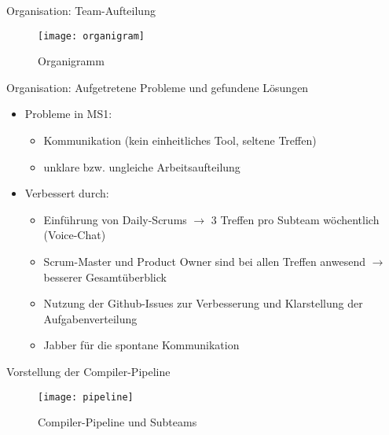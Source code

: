 \begin{frame}{Organisation: Team-Aufteilung}

\begin{figure}
  \begin{center}
    \leavevmode
      \texttt{[image: organigram]}
    \caption{Organigramm}
  \end{center}
\end{figure}

\end{frame}

\pagebreak

\begin{frame}{Organisation: Aufgetretene Probleme und gefundene L\"osungen}
	
	\pause
	\begin{itemize}
		\item Probleme in MS1:
		\pause
		\begin{itemize}
			\item Kommunikation (kein einheitliches Tool, seltene Treffen)
			\pause
			\item unklare bzw. ungleiche Arbeitsaufteilung
			\pause
		\end{itemize}
		\item Verbessert durch:
		\pause
		\begin{itemize}
			\item Einf\"uhrung von Daily-Scrums $\rightarrow$ 3 Treffen pro Subteam w\"ochentlich (Voice-Chat)
			\pause
			\item Scrum-Master und Product Owner sind bei allen Treffen anwesend $\rightarrow$ besserer Gesamt\"uberblick
			\pause
			\item Nutzung der Github-Issues zur Verbesserung und Klarstellung der Aufgabenverteilung
			\pause
			\item Jabber f\"ur die spontane Kommunikation
		\end{itemize}
	\end{itemize}
	
\end{frame}

\begin{frame}{Vorstellung der Compiler-Pipeline}

\begin{figure}
  \begin{center}
    \leavevmode
      \texttt{[image: pipeline]}
    \caption{Compiler-Pipeline und Subteams}
  \end{center}
\end{figure}

\end{frame}
